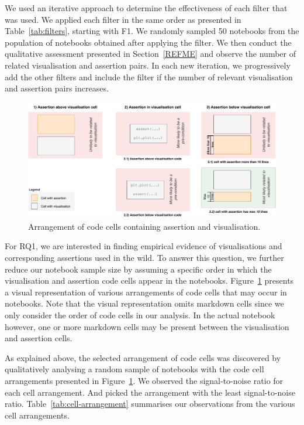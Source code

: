 \documentclass[acmsmall,screen,review,anonymous]{acmart}
\begin{document}
We used an iterative approach to determine the effectiveness of each
filter that was used. We applied each filter in the same order as
presented in Table~\ref{tab:filters}, starting with F1. We randomly
sampled 50 notebooks from the population of notebooks obtained after
applying the filter. We then conduct the qualitative assessment
presented in Section~\ref{REFME} and observe the number of related
visualisation and assertion pairs. In each new iteration, we
progressively add the other filters and include the filter if the
number of relevant visualisation and assertion pairs increases.

\begin{figure}
  \centering
  \includegraphics[width=\textwidth]{nb-structure.pdf}
  \caption{Arrangement of code cells containing assertion and
    visualisation.}
  \label{fig:cell-arrangement}
\end{figure}

For RQ1, we are interested in finding empirical evidence of
visualisations and corresponding assertions used in the wild. To
answer this question, we further reduce our notebook sample size by
assuming a specific order in which the visualisation and assertion
code cells appear in the notebooks. Figure~\ref{fig:cell-arrangement}
presents a visual representation of various arrangements of code cells
that may occur in notebooks. Note that the visual representation omits
markdown cells since we only consider the order of code cells in our
analysis. In the actual notebook however, one or more markdown cells
may be present between the visualisation and assertion cells.

As explained above, the selected arrangement of code cells was
discovered by qualitatively analysing a random sample of notebooks
with the code cell arrangements presented in
Figure~\ref{fig:cell-arrangement}. We observed the signal-to-noise
ratio for each cell arrangement. And picked the arrangement with the
least signal-to-noise ratio. Table~\ref{tab:cell-arrangement}
summarises our observations from the various cell arrangements.
\end{document}
